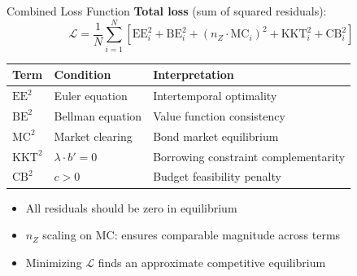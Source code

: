 \documentclass[aspectratio=169,11pt]{beamer}
\newcommand{\emphc}[1]{\textcolor{harvardcrimson}{#1}}
\begin{document}
\begin{frame}{Combined Loss Function}
\small
\textbf{Total loss} (sum of squared residuals):
\[
\boxed{\mathcal{L} = \frac{1}{N} \sum_{i=1}^{N} \left[\text{EE}_i^2 + \text{BE}_i^2 + (n_Z \cdot \text{MC}_i)^2 + \text{KKT}_i^2 + \text{CB}_i^2\right]}
\]

\vspace{0.1em}
\begin{center}
\begin{tabular}{lll}
\toprule
\textbf{Term} & \textbf{Condition} & \textbf{Interpretation} \\
\midrule
$\text{EE}^2$ & Euler equation & Intertemporal optimality \\
$\text{BE}^2$ & Bellman equation & Value function consistency \\
$\text{MC}^2$ & Market clearing & Bond market equilibrium \\
$\text{KKT}^2$ & $\lambda \cdot b' = 0$ & Borrowing constraint complementarity \\
$\text{CB}^2$ & $c > 0$ & Budget feasibility penalty \\
\bottomrule
\end{tabular}
\end{center}

\vspace{0.1em}
\begin{itemize}\footnotesize\itemsep0pt
    \item All residuals should be \emphc{zero} in equilibrium
    \item $n_Z$ scaling on MC: ensures comparable magnitude across terms
    \item Minimizing $\mathcal{L}$ finds an \emphc{approximate competitive equilibrium}
\end{itemize}
\end{frame}
\end{document}
